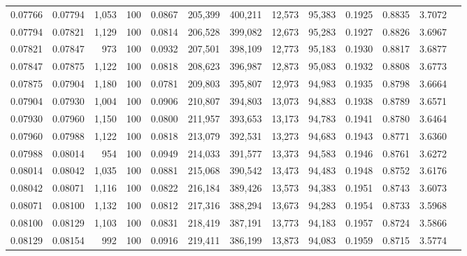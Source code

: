 \begin{tabular}{rrrrrrrrrrrrr}
0.07766 & 0.07794 & 1,053 & 100 &                                     0.0867 & 205,399 & 400,211 &  12,573 &  95,383 & 0.1925 & 0.8835 & 3.7072 \\
0.07794 & 0.07821 & 1,129 & 100 &                                     0.0814 & 206,528 & 399,082 &  12,673 &  95,283 & 0.1927 & 0.8826 & 3.6967 \\
0.07821 & 0.07847 &   973 & 100 &                                     0.0932 & 207,501 & 398,109 &  12,773 &  95,183 & 0.1930 & 0.8817 & 3.6877 \\
0.07847 & 0.07875 & 1,122 & 100 &                                     0.0818 & 208,623 & 396,987 &  12,873 &  95,083 & 0.1932 & 0.8808 & 3.6773 \\
0.07875 & 0.07904 & 1,180 & 100 &                                     0.0781 & 209,803 & 395,807 &  12,973 &  94,983 & 0.1935 & 0.8798 & 3.6664 \\
0.07904 & 0.07930 & 1,004 & 100 &                                     0.0906 & 210,807 & 394,803 &  13,073 &  94,883 & 0.1938 & 0.8789 & 3.6571 \\
0.07930 & 0.07960 & 1,150 & 100 &                                     0.0800 & 211,957 & 393,653 &  13,173 &  94,783 & 0.1941 & 0.8780 & 3.6464 \\
0.07960 & 0.07988 & 1,122 & 100 &                                     0.0818 & 213,079 & 392,531 &  13,273 &  94,683 & 0.1943 & 0.8771 & 3.6360 \\
0.07988 & 0.08014 &   954 & 100 &                                     0.0949 & 214,033 & 391,577 &  13,373 &  94,583 & 0.1946 & 0.8761 & 3.6272 \\
0.08014 & 0.08042 & 1,035 & 100 &                                     0.0881 & 215,068 & 390,542 &  13,473 &  94,483 & 0.1948 & 0.8752 & 3.6176 \\
0.08042 & 0.08071 & 1,116 & 100 &                                     0.0822 & 216,184 & 389,426 &  13,573 &  94,383 & 0.1951 & 0.8743 & 3.6073 \\
0.08071 & 0.08100 & 1,132 & 100 &                                     0.0812 & 217,316 & 388,294 &  13,673 &  94,283 & 0.1954 & 0.8733 & 3.5968 \\
0.08100 & 0.08129 & 1,103 & 100 &                                     0.0831 & 218,419 & 387,191 &  13,773 &  94,183 & 0.1957 & 0.8724 & 3.5866 \\
0.08129 & 0.08154 &   992 & 100 &                                     0.0916 & 219,411 & 386,199 &  13,873 &  94,083 & 0.1959 & 0.8715 & 3.5774 \\

\end{tabular}
